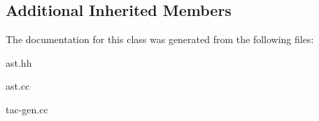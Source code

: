 \subsection*{Additional Inherited Members}


The documentation for this class was generated from the following files\+:\begin{DoxyCompactItemize}
\item 
ast.\+hh\item 
ast.\+cc\item 
tac-\/gen.\+cc\end{DoxyCompactItemize}
